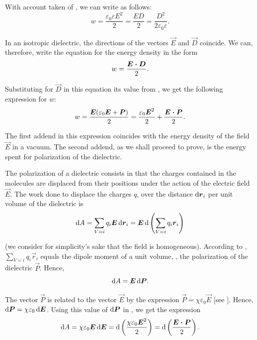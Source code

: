 \noindent
With account taken of , we can write  as follows:
\begin{equation}\label{eq:4_11}
	w = \frac{\varepsilon_0 \varepsilon E^2}{2} = \frac{E D}{2} = \frac{D^2}{2 \varepsilon_0 \varepsilon}.
\end{equation}

In an isotropic dielectric, the directions of the vectors $\vec{E}$ and $\vec{D}$ coincide. We can, therefore, write the equation for the energy density in the form
\begin{equation*}
	w = \frac{\boldsymbol{E\cdot D}}{2}.
\end{equation*}

\noindent
Substituting for $\vec{D}$ in this equation its value from , we get the following expression for $w$:
\begin{equation}\label{eq:4_12}
	w = \frac{\boldsymbol{E} (\varepsilon_0 \boldsymbol{E} + \boldsymbol{P})}{2} = \frac{\varepsilon_0 \boldsymbol{E}^2}{2} + \frac{\boldsymbol{E\cdot P}}{2}.
\end{equation}

\noindent
The first addend in this expression coincides with the energy density of the field $\vec{E}$ in a vacuum. The second addend, as we shall proceed to prove, is the energy spent for polarization of the dielectric.

The polarization of a dielectric consists in that the charges contained in the molecules are displaced from their positions under the action of the electric field $\vec{E}$. The work done to displace the charges $q$, over the distance $\mathrm{d}\boldsymbol{r}_i$ per unit volume of the dielectric is
\begin{equation*}
	\mathrm{d} A = \sum_{V=i} q_i \boldsymbol{E}\, \mathrm{d}\boldsymbol{r}_i = \boldsymbol{E}\, \mathrm{d}\left(\sum_{V=i} q_i \boldsymbol{r}_i\right)
\end{equation*}

\noindent
(we consider for simplicity's sake that the field is homogeneous). According to , $\sum_{V=i}q_i\vec{r}_i$ equals the dipole moment of a unit volume, \ie, the polarization of the dielectric $\vec{P}$. Hence,
\begin{equation}\label{eq:4_13}
	\mathrm{d} A = \boldsymbol{E}\, \mathrm{d}\boldsymbol{P}.
\end{equation}

\noindent
The vector $\vec{P}$ is related to the vector $\vec{E}$ by the expression $\vec{P}=\chi \varepsilon_0\vec{E}$ [see ]. Hence, $\mathrm{d}\boldsymbol{P}=\chi\varepsilon_0\, \mathrm{d}\boldsymbol{E}$. Using this value of $\mathrm{d}\boldsymbol{P}$ in , we get the expression
\begin{equation*}
	\mathrm{d} A = \chi \varepsilon_0 \boldsymbol{E}\, \mathrm{d}\boldsymbol{E} = \mathrm{d}\left(\frac{\chi \varepsilon_0 \boldsymbol{E}^2}{2}\right) = \mathrm{d}\left(\frac{\boldsymbol{E\cdot P}}{2}\right).
\end{equation*}

